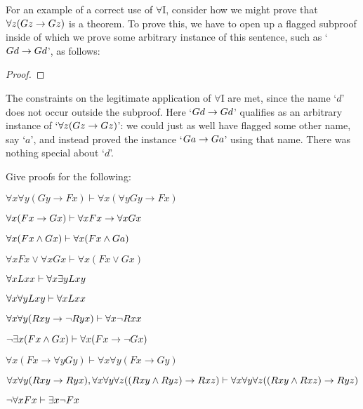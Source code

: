 For an example of a correct use of $\forall$I, consider how we might prove that $\forall z(Gz \rightarrow Gz)$ is a theorem.  To prove this, we have to open up a flagged subproof inside of which we prove some arbitrary instance of this sentence, such as `$Gd \rightarrow Gd$', as follows:

\begin{proof}
	\open
	 \fl{}
	\open
		 
	\close
	\close
\end{proof}
The constraints on the legitimate application of $\forall$I are met, since the name `$d$' does not occur outside the subproof.  Here `$Gd \rightarrow Gd$' qualifies as an arbitrary instance of `$\forall z(Gz \rightarrow Gz)$': we could just as well have flagged some other name, say `$a$', and instead proved the instance `$Ga \rightarrow Ga$' using that name. There was nothing special about `$d$'.


\practiceproblems
\problempart Give proofs for the following:


\begin{earg}

\item $\forall x\forall y(Gy\rightarrow Fx) \vdash \forall x(\forall yGy\rightarrow Fx)$

\item $\forall x(Fx \rightarrow Gx) \vdash \forall xFx \rightarrow \forall x Gx$

\item $\forall x (Fx \wedge Gx) \vdash \forall x(Fx \wedge Ga)$

\item $\forall xFx\lor \forall xGx \vdash \forall x(Fx\lor Gx)$

\item $\forall xLxx \vdash \forall x \exists y Lxy$

\item $\forall x \forall y Lxy \vdash \forall xLxx$

\item $\forall x\forall y(Rxy \rightarrow \neg Ryx) \vdash \forall x \neg Rxx$


\item $\neg \exists x(Fx \wedge Gx) \vdash \forall x(Fx \rightarrow \neg Gx)$

\item $\forall x(Fx\rightarrow \forall yGy) \vdash \forall x\forall y(Fx\rightarrow Gy)$

\item $\forall x \forall y(Rxy \rightarrow Ryx), \forall x \forall y \forall z((Rxy \wedge Ryz) \rightarrow Rxz) \vdash \forall x \forall y\forall z((Rxy \wedge Rxz) \rightarrow Ryz)$

\item  $\neg \forall xFx \vdash \exists x\neg Fx$


\end{earg}






